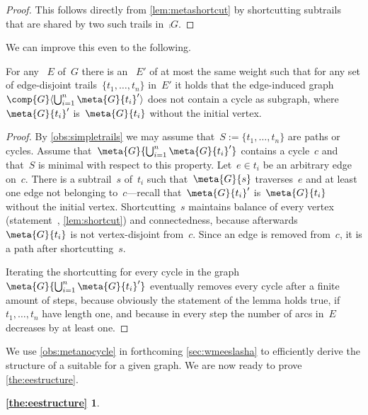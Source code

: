\begin{proof}
This follows directly from \autoref{lem:metashortcut} by shortcutting subtrails that are shared by two such trails in~$\comp{G}$.
\end{proof}
We can improve this even to the following.
\begin{observation}\label{obs:metanocycle}
  For any \EE{}~$E$ of~$G$ there is an \EE{}~$E'$ of at most the same weight such that for any set of edge-disjoint trails~$\{t_1, \ldots, t_n\}$ in~$E'$ it holds that the edge-induced graph~$\comp{G}\langle\bigcup_{i=1}^n\meta{G}{t_i}'\rangle$ does not contain a cycle as subgraph, where~$\meta{G}{t_i}'$ is~$\meta{G}{t_i}$ without the initial vertex.
\end{observation}
\begin{proof}
  By \autoref{obs:simpletrails} we may assume that~$S := \{t_1, \ldots, t_n\}$ are paths or cycles. Assume that~$\meta{G}{\bigcup_{i=1}^n\meta{G}{t_i}'}$ contains a cycle~$c$ and that~$S$ is minimal with respect to this property. Let~$e \in t_i$ be an arbitrary edge on~$c$. There is a subtrail~$s$ of~$t_i$ such that~$\meta{G}{s}$ traverses~$e$ and at least one edge not belonging to~$c$---recall that~$\meta{G}{t_i}'$ is~$\meta{G}{t_i}$ without the initial vertex. Shortcutting~$s$ maintains balance of every vertex (statement~, \autoref{lem:shortcut}) and connectedness, because afterwards~$\meta{G}{t_i}$ is not vertex-disjoint from~$c$. Since an edge is removed from~$c$, it is a path after shortcutting~$s$.

  Iterating the shortcutting for every cycle in the graph~$\meta{G}{\bigcup_{i=1}^n\meta{G}{t_i}'}$ eventually removes every cycle after a finite amount of steps, because obviously the statement of the lemma holds true, if~$t_1, \ldots, t_n$ have length one, and because in every step the number of arcs in~$E$ decreases by at least one.
\end{proof}
We use \autoref{obs:metanocycle} in forthcoming \autoref{sec:wmeeslasha} to efficiently derive the structure of a suitable \EE{} for a given graph. We are now ready to prove \autoref{the:eestructure}.
\newtheorem*{rep}{\autoref{the:eestructure}}
\begin{rep}
  \eestructuretheorem
\end{rep}
